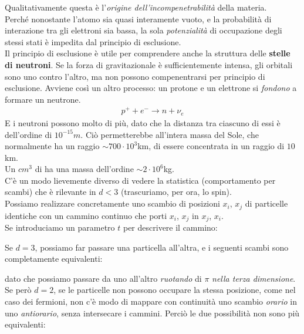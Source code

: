 \documentclass[../../FisicaTeorica.tex]{subfiles}
\begin{document}
Qualitativamente questa è l'\textit{origine dell'incompenetrabilità} della materia.\\
Perché nonostante l'atomo sia quasi interamente vuoto, e la probabilità di interazione tra gli elettroni sia bassa, la sola \textit{potenzialità} di occupazione degli stessi stati è impedita dal principio di esclusione.\\

Il principio di esclusione è utile per comprendere anche la struttura delle \textbf{stelle di neutroni}. Se la forza di gravitazionale è sufficientemente intensa, gli orbitali sono  uno contro l'altro, ma non possono compenentrarsi per principio di esclusione. Avviene così un altro processo: un protone e un elettrone si \textit{fondono} a formare un neutrone.
\begin{align*}
p^+ + e^- \to n + \nu_e
\end{align*}
E i neutroni possono  molto di più, dato che la distanza tra ciascuno di essi è dell'ordine di $10^{-15}m$. Ciò permetterebbe all'intera massa del Sole, che normalmente ha un raggio $\sim 700\cdot 10^3$km, di essere concentrata in un raggio di $10$km.\\
Un $cm^3$ di  ha una massa dell'ordine $\sim 2\cdot 10^6$kg.\\

C'è un modo lievemente diverso di vedere la statistica (comportamento per scambi) che è rilevante in $d<3$ (trascuriamo, per ora, lo spin).\\
Possiamo realizzare concretamente uno scambio di posizioni $x_i$, $x_j$ di particelle identiche con un cammino continuo che porti $x_i$, $x_j$ in $x_j$, $x_i$.\\

Se introduciamo un parametro $t$ per descrivere il cammino:

Se $d=3$, possiamo far passare una particella  all'altra, e i seguenti scambi sono completamente equivalenti:

dato che possiamo passare da uno all'altro \textit{ruotando} di $\pi$ \textit{nella terza dimensione}.\\

Se però $d=2$, se le particelle non possono occupare la stessa posizione, come nel caso dei fermioni, non c'è modo di mappare con continuità uno scambio \textit{orario} in uno \textit{antiorario}, senza intersecare i cammini. Perciò le due possibilità non sono più equivalenti:
\end{document}
